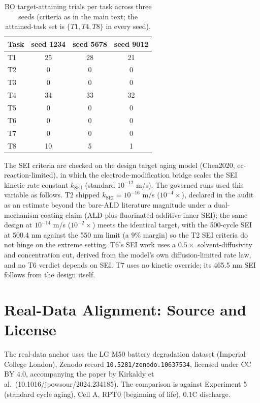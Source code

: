 \documentclass[review,11pt]{elsarticle}
\begin{document}
\begin{table}[!ht]
\centering
\caption{BO target-attaining trials per task across three seeds
(criteria as in the main text; the attained-task set is
$\{T1, T4, T8\}$ in every seed).}
\label{tab:boseeds}
\begin{tabular}{lccc}
\toprule
Task & seed 1234 & seed 5678 & seed 9012 \\
\midrule
T1 & 25 & 28 & 21 \\
T2 & 0 & 0 & 0 \\
T3 & 0 & 0 & 0 \\
T4 & 34 & 33 & 32 \\
T5 & 0 & 0 & 0 \\
T6 & 0 & 0 & 0 \\
T7 & 0 & 0 & 0 \\
T8 & 10 & 5 & 1 \\
\bottomrule
\end{tabular}
\end{table}

The SEI criteria are checked on the design target aging model (Chen2020,
ec-reaction-limited), in which the electrode-modification bridge scales the
SEI kinetic rate constant $k_{\mathrm{SEI}}$ (standard $10^{-12}$ m/s).
The governed runs used this variable as follows. T2 shipped $k_{\mathrm{SEI}} =
10^{-16}$ m/s ($10^{-4}\times$), declared in the audit as an estimate
beyond the bare-ALD literature magnitude under a dual-mechanism coating
claim (ALD plus fluorinated-additive inner SEI); the same design at
$10^{-14}$ m/s ($10^{-2}\times$) meets the identical target, with the
500-cycle SEI at 500.4 nm against the 550 nm limit (a $9\%$ margin) so
the T2 SEI criteria do not hinge on the extreme setting. T6's SEI work uses
a $0.5\times$ solvent-diffusivity and concentration cut, derived from the
model's own diffusion-limited rate law, and no T6 verdict depends on SEI.
T7 uses no kinetic override; its 465.5 nm SEI follows from the design
itself.

\section{Real-Data Alignment: Source and License}

The real-data anchor uses the LG M50 battery degradation dataset
(Imperial College London)\@, Zenodo record
\texttt{10.5281/zenodo.10637534}, licensed under CC BY 4.0,
accompanying the paper by Kirkaldy et al.\
(10.1016/\allowbreak jpowsour/2024.234185). The comparison is against
Experiment 5
(standard cycle aging), Cell A, RPT0 (beginning of life), $0.1$C discharge.
\end{document}
